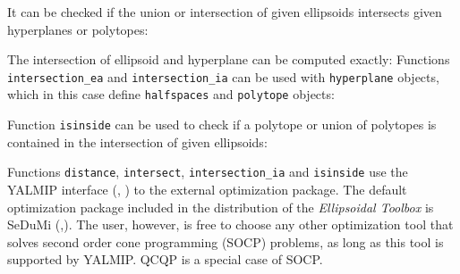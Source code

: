\documentclass{report}
\begin{document}
It can be checked if the union or intersection of given ellipsoids intersects
given hyperplanes or polytopes:



The intersection of ellipsoid and hyperplane can be computed exactly:
Functions {\tt intersection\_ea} and {\tt intersection\_ia} can be used
with {\tt hyperplane} objects, which in this case define {\tt halfspaces} and
{\tt polytope} objects:

Function {\tt isinside} can be used to check if a polytope or union of
polytopes is contained in the intersection of given ellipsoids:

Functions {\tt distance}, {\tt intersect}, {\tt intersection\_ia} and
{\tt isinside} use the YALMIP interface (\cite{yalmip}, \cite{yalmiphp}) to the
external optimization package. The default optimization package included
in the distribution of the {\it Ellipsoidal Toolbox} is SeDuMi
(\cite{sedumi},\cite{sedumihp}). The user, however, is free to choose
any other optimization tool that solves second order cone programming (SOCP)
problems, as long as this tool is supported by YALMIP. QCQP is a special case
of SOCP.
\end{document}
